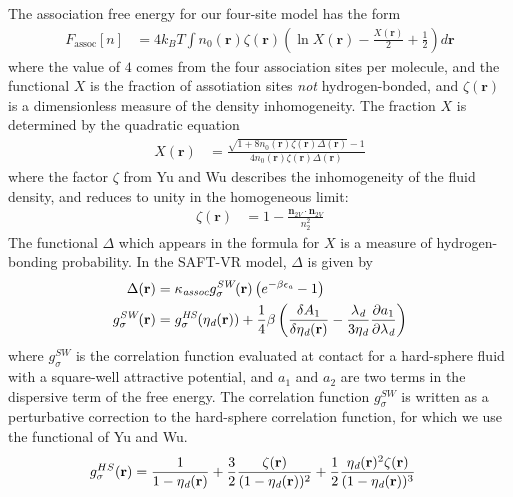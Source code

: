 \documentclass[letterpaper,twocolumn,amsmath,amssymb,prb]{revtex4-1}
\newcommand{\xx}{\textbf{r}}
\begin{document}
The association free energy for our four-site model has the form
\begin{align}
  F_\text{assoc}[n] &= 4 k_BT \int n_0(\xx)\zeta(\xx)
  \left(\ln X(\xx) - \frac{X(\xx)}{2} + \frac12\right) d\xx
\end{align}
where the value of $4$ comes from the four association sites per
molecule, and the functional $X$ is the fraction of assotiation sites
\emph{not} hydrogen-bonded, and $\zeta(\xx)$ is a dimensionless
measure of the density inhomogeneity.  The fraction $X$ is determined
by the quadratic equation
\begin{align}
  X(\xx) &= \frac{\sqrt{1 + 8n_0(\xx)\zeta(\xx)\Delta(\xx)} - 1}
  {4 n_0(\xx)\zeta(\xx)\Delta(\xx)}
\end{align}
where the factor $\zeta$ from
Yu and Wu\cite{yu2002fmt-dft-inhomogeneous-associating,
  fu2005vapor-liquid-dft} describes the inhomogeneity of the fluid
density, and reduces to unity in the homogeneous limit:
\begin{align}
  \zeta(\xx) &= 1 - \frac{\mathbf{n}_{2V}\cdot\mathbf{n}_{2V}}{n_2^2}
\end{align}
The functional $\Delta$ which appears in the formula for $X$ is a
measure of hydrogen-bonding probability.  In the SAFT-VR
model\cite{gil-villegas-1997-SAFT-VR}, $\Delta$ is given by
\begin{align}
  \Delta(\xx) &= \kappa_\textit{assoc} g^\textit{SW}_\sigma(\xx)
  \left(e^{-\beta\epsilonassoc} - 1\right) \\
  g^\textit{SW}_\sigma(\xx) &= g^\textit{HS}_\sigma(\etadisp(\xx)) +
  \frac{1}{4}\beta\left(\frac{\delta A_1}{\delta \etadisp(\xx)} -
  \frac{\lambdadisp}{3 \etadisp}\frac{\partial a_1}{\partial \lambdadisp}\right)
\end{align}
where $g^\textit{SW}_\sigma$ is the correlation function evaluated at
contact for a hard-sphere fluid with a square-well attractive
potential, and $a_1$ and $a_2$ are two terms in the dispersive term of
the free energy.  The correlation function $g^\textit{SW}_\sigma$ is
written as a perturbative correction to the hard-sphere correlation
function, for which we use the functional of Yu and
Wu.\cite{yu2002fmt-dft-inhomogeneous-associating}
\begin{align}
  g_\sigma^{HS}(\xx) &= \frac{1}{1-\etadisp(\xx)}
  +\frac32\frac{\zeta(\xx)}{(1-\etadisp(\xx))^2}
  + \frac12\frac{\etadisp(\xx)^2\zeta(\xx)}{(1-\etadisp(\xx))^3}
\end{align}
\end{document}
